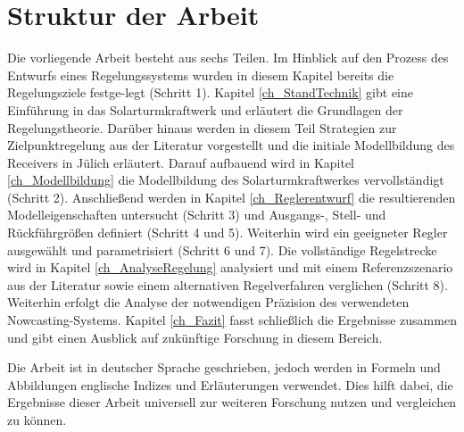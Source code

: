 \section{Struktur der Arbeit} \label{sec_Struktur}
Die vorliegende Arbeit besteht aus sechs Teilen.
Im Hinblick auf den Prozess des Entwurfs eines Regelungssystems wurden in diesem Kapitel bereits die Regelungsziele festge-\linebreak legt (Schritt 1).
Kapitel \ref{ch_StandTechnik} gibt eine Einführung in das Solarturmkraftwerk und erläutert die Grundlagen der Regelungstheorie.
Darüber hinaus werden in diesem Teil Strategien zur Zielpunktregelung aus der Literatur vorgestellt und die initiale Modellbildung des Receivers in Jülich erläutert.
Darauf aufbauend wird in Kapitel \ref{ch_Modellbildung} die Modellbildung des Solarturmkraftwerkes vervollständigt (Schritt 2).
Anschließend werden in Kapitel \ref{ch_Reglerentwurf} die resultierenden Modelleigenschaften untersucht (Schritt 3) und Ausgangs-, Stell- und Rückführgrößen definiert (Schritt 4 und 5).
Weiterhin wird ein geeigneter Regler ausgewählt und parametrisiert (Schritt 6 und 7).
Die vollständige Regelstrecke wird in Kapitel \ref{ch_AnalyseRegelung} analysiert und mit einem Referenzszenario aus der Literatur sowie einem alternativen Regelverfahren verglichen (Schritt 8).
Weiterhin erfolgt die Analyse der notwendigen Präzision des verwendeten Nowcasting-Systems.
Kapitel \ref{ch_Fazit} fasst schließlich die Ergebnisse zusammen und gibt einen Ausblick auf zukünftige Forschung in diesem Bereich.

Die Arbeit ist in deutscher Sprache geschrieben, jedoch werden in Formeln und Abbildungen englische Indizes und Erläuterungen verwendet.
Dies hilft dabei, die Ergebnisse dieser Arbeit universell zur weiteren Forschung nutzen und vergleichen zu können.


